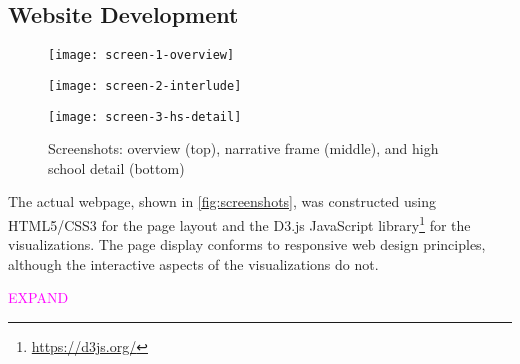 \subsection{Website Development}\label{sec:development}
\begin{figure}
  \texttt{[image: screen-1-overview]}


  \texttt{[image: screen-2-interlude]}


  \texttt{[image: screen-3-hs-detail]}
  \caption{Screenshots: overview (top), narrative frame (middle), and high school detail (bottom)}\label{fig:screenshots}
\end{figure}

The actual webpage, shown in \autoref{fig:screenshots}, was constructed using HTML5/CSS3 for the page layout and the D3.js JavaScript library\footnote{\url{https://d3js.org/}} for the visualizations. The page display conforms to responsive web design principles, although the interactive aspects of the visualizations do not.

\textcolor{magenta}{EXPAND}
